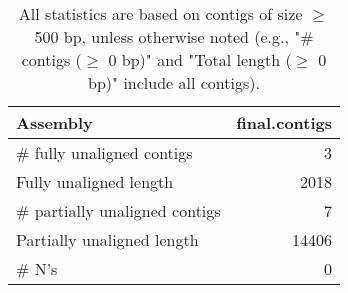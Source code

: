 \documentclass[12pt,a4paper]{article}
\begin{document}
\begin{table}[ht]
\begin{center}
\caption{All statistics are based on contigs of size $\geq$ 500 bp, unless otherwise noted (e.g., "\# contigs ($\geq$ 0 bp)" and "Total length ($\geq$ 0 bp)" include all contigs).}
\begin{tabular}{|l*{1}{|r}|}
\hline
Assembly & final.contigs \\ \hline
\# fully unaligned contigs & 3 \\ \hline
Fully unaligned length & 2018 \\ \hline
\# partially unaligned contigs & 7 \\ \hline
Partially unaligned length & 14406 \\ \hline
\# N's & 0 \\ \hline
\end{tabular}
\end{center}
\end{table}
\end{document}
